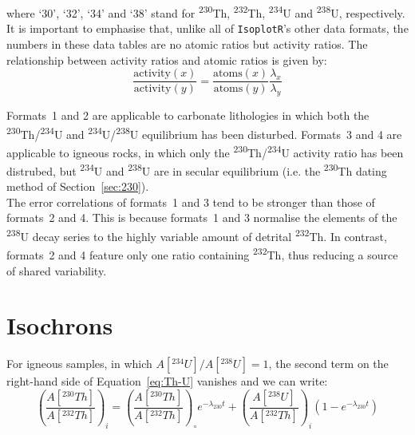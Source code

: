 \begin{refsection}
\noindent where `30', `32', `34' and `38' stand for
\textsuperscript{230}Th, \textsuperscript{232}Th,
\textsuperscript{234}U and \textsuperscript{238}U, respectively.  It
is important to emphasise that, unlike all of \texttt{IsoplotR}'s
other data formats, the numbers in these data tables are no atomic
ratios but activity ratios. The relationship between activity ratios
and atomic ratios is given by:
\begin{equation}
  \frac{\mbox{activity}(x)}{\mbox{activity}(y)} =
  \frac{\mbox{atoms}(x)}{\mbox{atoms}(y)}
  \frac{\lambda_{x}}{\lambda_{y}}
\end{equation}

Formats~1 and 2 are applicable to carbonate lithologies in which both
the \textsuperscript{230}Th/\textsuperscript{234}U and
\textsuperscript{234}U/\textsuperscript{238}U equilibrium has been
disturbed. Formats~3 and 4 are applicable to igneous rocks, in which
only the \textsuperscript{230}Th/\textsuperscript{234}U activity ratio
has been distrubed, but \textsuperscript{234}U and
\textsuperscript{238}U are in secular equilibrium (i.e. the
\textsuperscript{230}Th dating method of Section~\ref{sec:230}).\\

The error correlations of formats~1 and 3 tend to be stronger than
those of formats~2 and 4. This is because formats~1 and 3 normalise
the elements of the \textsuperscript{238}U decay series to the highly
variable amount of detrital \textsuperscript{232}Th. In contrast,
formats~2 and 4 feature only one ratio containing
\textsuperscript{232}Th, thus reducing a source of shared variability.

\section{Isochrons}

For igneous samples, in which $A[{}^{234}U]/A[{}^{238}U] = 1$, the
second term on the right-hand side of Equation~\ref{eq:Th-U} vanishes
and we can write:
\begin{equation}
  \left(\frac{A[{}^{230}Th]}{A[{}^{232}Th]}\right)_i = 
  \left(\frac{A[{}^{230}Th]}{A[{}^{232}Th]}\right)_{\!\circ}
  e^{-\lambda_{230}t} +
  \left(\frac{A[{}^{238}U]}{A[{}^{232}Th]}\right)_i
  \left(1-e^{-\lambda_{230}t}\right)
  \label{eq:rosholt}
\end{equation}


\end{refsection}
